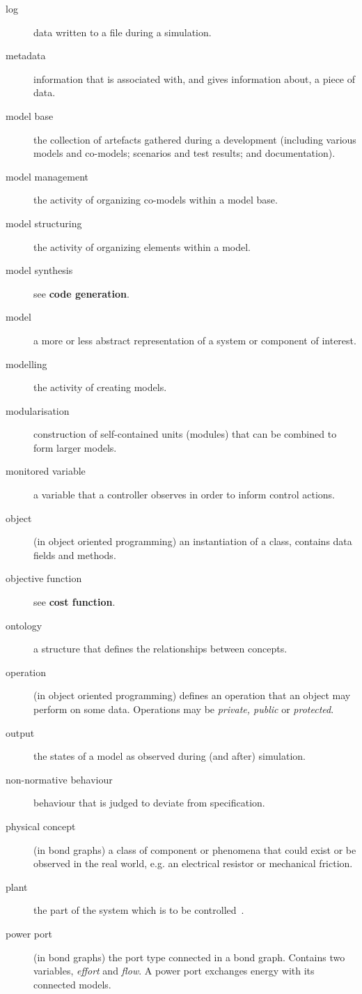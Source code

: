 \documentclass{crescendorepchap}
\begin{document}
\begin{description}
\item[log] data written to a file during a simulation.
\item[metadata] information that is associated with, and gives information about, a piece of data.
\item[model base] the collection of artefacts gathered during a development (including various models and co-models; scenarios and test results; and documentation).
\item[model management] the activity of organizing co-models within a model base.
\item[model structuring] the activity of organizing elements within a model.
\item[model synthesis] see \textbf{code generation}.
\item[model] a more or less abstract representation of a system or component of interest.
\item[modelling] the activity of creating models.
\item[modularisation] construction of self-contained units (modules) that can be combined to form larger models.
\item[monitored variable] a variable that a controller observes in order to inform control actions.
\item[object] (in object oriented programming) an instantiation of a class, contains data fields and methods.
\item[objective function] see \textbf{cost function}.
\item[ontology] a structure that defines the relationships between concepts.
\item[operation] (in object oriented programming) defines an operation that an object may perform on some data.  Operations may be \emph{private, public} or \emph{protected}.
\item[output] the states of a model as observed during (and after) simulation.
\item[non-normative behaviour] behaviour that is judged to deviate from specification.
\item[physical concept] (in bond graphs) a class of component or phenomena that could exist or be observed in the real world, e.g. an electrical resistor or mechanical friction.
\item[plant] the part of the system which is to be controlled~\cite{IEEE100}.
\item[power port] (in bond graphs) the port type connected in a bond graph.  Contains two variables, \textit{effort} and \textit{flow}.  A power port exchanges energy with its connected models.

\end{description}
\end{document}
